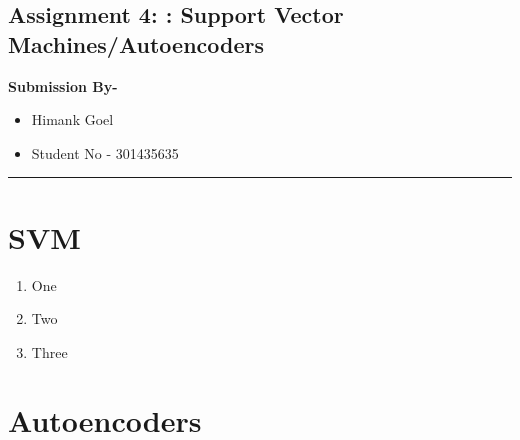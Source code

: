\documentclass[12pt]{article}
\begin{document}

\subsection*{Assignment 4: : Support Vector Machines/Autoencoders}

{\bf Submission By-}
\begin{itemize}[noitemsep, nolistsep]
    \item[] Himank Goel
    \item[] Student No - 301435635   
\end{itemize}
\rule{\textwidth}{1mm}

\section{SVM}

\begin{enumerate}
  \item One
  \item Two
  \item Three
\end{enumerate}

\section{Autoencoders}
\end{document}
